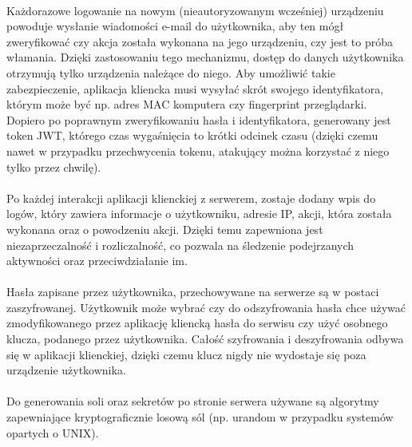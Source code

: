 \documentclass{article}
\begin{document}
    \paragraph{}Każdorazowe logowanie na nowym (nieautoryzowanym wcześniej) urządzeniu powoduje wysłanie wiadomości e-mail do użytkownika, aby ten mógł zweryfikować czy akcja została wykonana na jego urządzeniu, czy jest to próba włamania. Dzięki zastosowaniu tego mechanizmu, dostęp do danych użytkownika otrzymują tylko urządzenia należące do niego. Aby umożliwić takie zabezpieczenie, aplikacja kliencka musi wysyłać skrót swojego identyfikatora, którym może być np. adres MAC komputera czy fingerprint przeglądarki. Dopiero po poprawnym zweryfikowaniu hasła i identyfikatora, generowany jest token JWT, którego czas wygaśnięcia to krótki odcinek czasu (dzięki czemu nawet w przypadku przechwycenia tokenu, atakujący można korzystać z niego tylko przez chwilę).

    \paragraph{}Po każdej interakcji aplikacji klienckiej z serwerem, zostaje dodany wpis do logów, który zawiera informacje o użytkowniku, adresie IP, akcji, która została wykonana oraz o powodzeniu akcji. Dzięki temu zapewniona jest niezaprzeczalność i rozliczalność, co pozwala na śledzenie podejrzanych aktywności oraz przeciwdziałanie im.

    \paragraph{}Hasła zapisane przez użytkownika, przechowywane na serwerze są w postaci zaszyfrowanej. Użytkownik może wybrać czy do odszyfrowania hasła chce używać zmodyfikowanego przez aplikację kliencką hasła do serwisu czy użyć osobnego klucza, podanego przez użytkownika. Całość szyfrowania i deszyfrowania odbywa się w aplikacji klienckiej, dzięki czemu klucz nigdy nie wydostaje się poza urządzenie użytkownika.

    \paragraph{}Do generowania soli oraz sekretów po stronie serwera używane są algorytmy zapewniające kryptograficznie losową sól (np. urandom w przypadku systemów opartych o UNIX).


\end{document}
